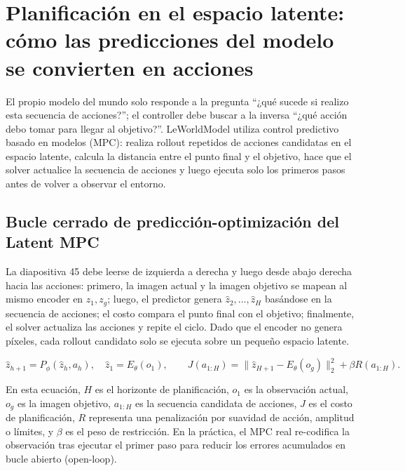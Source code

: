\section{Planificación en el espacio latente: cómo las predicciones del modelo se convierten en acciones}

El propio modelo del mundo solo responde a la pregunta ``¿qué sucede si realizo esta secuencia de acciones?''; el controller debe buscar a la inversa ``¿qué acción debo tomar para llegar al objetivo?''. LeWorldModel utiliza control predictivo basado en modelos (MPC): realiza rollout repetidos de acciones candidatas en el espacio latente, calcula la distancia entre el punto final y el objetivo, hace que el solver actualice la secuencia de acciones y luego ejecuta solo los primeros pasos antes de volver a observar el entorno.

\subsection{Bucle cerrado de predicción-optimización del Latent MPC}

La diapositiva 45 debe leerse de izquierda a derecha y luego desde abajo derecha hacia las acciones: primero, la imagen actual y la imagen objetivo se mapean al mismo encoder en $z_1, z_g$; luego, el predictor genera $\hat z_2, \ldots, \hat z_H$ basándose en la secuencia de acciones; el costo compara el punto final con el objetivo; finalmente, el solver actualiza las acciones y repite el ciclo. Dado que el encoder no genera píxeles, cada rollout candidato solo se ejecuta sobre un pequeño espacio latente.


\[
\hat z_{h+1}=P_\phi(\hat z_h,a_h),\quad \hat z_1=E_\theta(o_1),
\qquad
J(a_{1:H})=\|\hat z_{H+1}-E_\theta(o_g)\|_2^2+\beta R(a_{1:H}).
\]

En esta ecuación, $H$ es el horizonte de planificación, $o_1$ es la observación actual, $o_g$ es la imagen objetivo, $a_{1:H}$ es la secuencia candidata de acciones, $J$ es el costo de planificación, $R$ representa una penalización por suavidad de acción, amplitud o límites, y $\beta$ es el peso de restricción. En la práctica, el MPC real re-codifica la observación tras ejecutar el primer paso para reducir los errores acumulados en bucle abierto (open-loop).

